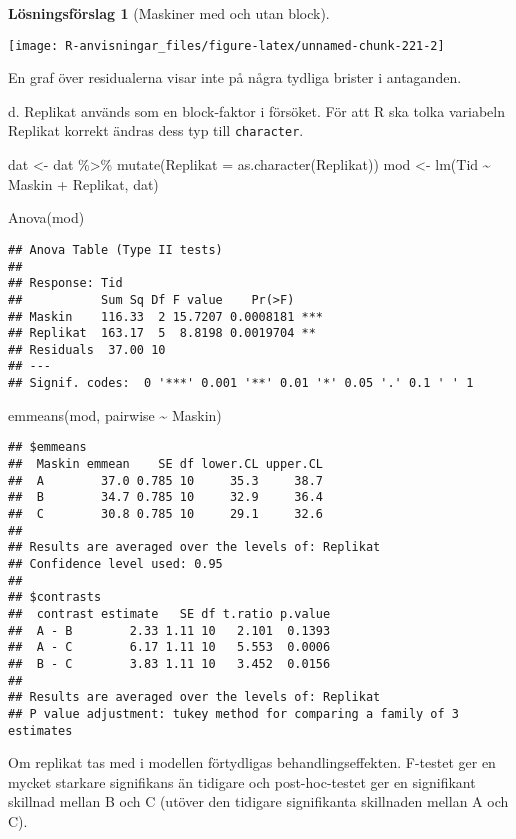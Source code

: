 \documentclass[
]{book}
\newenvironment{Shaded}{\begin{snugshade}}{\end{snugshade}}
\newcommand{\AttributeTok}[1]{\textcolor[rgb]{0.77,0.63,0.00}{#1}}
\newcommand{\FunctionTok}[1]{\textcolor[rgb]{0.00,0.00,0.00}{#1}}
\newcommand{\NormalTok}[1]{#1}
\newcommand{\OtherTok}[1]{\textcolor[rgb]{0.56,0.35,0.01}{#1}}
\newcommand{\SpecialCharTok}[1]{\textcolor[rgb]{0.00,0.00,0.00}{#1}}
\theoremstyle{definition}
\theoremstyle{definition}
\theoremstyle{definition}
\theoremstyle{definition}
\newtheorem{hypothesis}{Lösningsförslag}[chapter]
\theoremstyle{remark}
\begin{document}
\begin{hypothesis}[Maskiner med och utan block]
\begin{center}\texttt{[image: R-anvisningar\_files/figure-latex/unnamed-chunk-221-2]} \end{center}

En graf över residualerna visar inte på några tydliga brister i antaganden.

d. Replikat används som en block-faktor i försöket. För att R ska tolka variabeln Replikat korrekt ändras dess typ till \texttt{character}.

\begin{Shaded}
\begin{Highlighting}[]
\NormalTok{dat }\OtherTok{\textless{}{-}}\NormalTok{ dat }\SpecialCharTok{\%\textgreater{}\%} \FunctionTok{mutate}\NormalTok{(}\AttributeTok{Replikat =} \FunctionTok{as.character}\NormalTok{(Replikat))}
\NormalTok{mod }\OtherTok{\textless{}{-}} \FunctionTok{lm}\NormalTok{(Tid }\SpecialCharTok{\textasciitilde{}}\NormalTok{ Maskin }\SpecialCharTok{+}\NormalTok{ Replikat, dat)}

\FunctionTok{Anova}\NormalTok{(mod)}
\end{Highlighting}
\end{Shaded}

\begin{verbatim}
## Anova Table (Type II tests)
## 
## Response: Tid
##           Sum Sq Df F value    Pr(>F)    
## Maskin    116.33  2 15.7207 0.0008181 ***
## Replikat  163.17  5  8.8198 0.0019704 ** 
## Residuals  37.00 10                      
## ---
## Signif. codes:  0 '***' 0.001 '**' 0.01 '*' 0.05 '.' 0.1 ' ' 1
\end{verbatim}

\begin{Shaded}
\begin{Highlighting}[]
\FunctionTok{emmeans}\NormalTok{(mod, pairwise }\SpecialCharTok{\textasciitilde{}}\NormalTok{ Maskin)}
\end{Highlighting}
\end{Shaded}

\begin{verbatim}
## $emmeans
##  Maskin emmean    SE df lower.CL upper.CL
##  A        37.0 0.785 10     35.3     38.7
##  B        34.7 0.785 10     32.9     36.4
##  C        30.8 0.785 10     29.1     32.6
## 
## Results are averaged over the levels of: Replikat 
## Confidence level used: 0.95 
## 
## $contrasts
##  contrast estimate   SE df t.ratio p.value
##  A - B        2.33 1.11 10   2.101  0.1393
##  A - C        6.17 1.11 10   5.553  0.0006
##  B - C        3.83 1.11 10   3.452  0.0156
## 
## Results are averaged over the levels of: Replikat 
## P value adjustment: tukey method for comparing a family of 3 estimates
\end{verbatim}

Om replikat tas med i modellen förtydligas behandlingseffekten. F-testet ger en mycket starkare signifikans än tidigare och post-hoc-testet ger en signifikant skillnad mellan B och C (utöver den tidigare signifikanta skillnaden mellan A och C).
\end{hypothesis}
\end{document}
